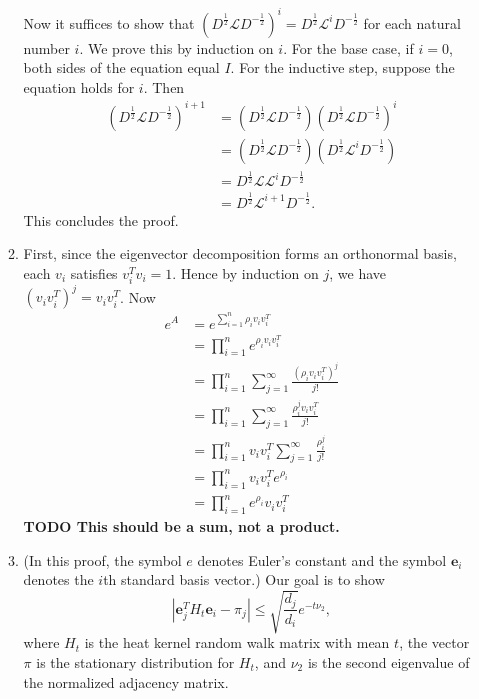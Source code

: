 \documentclass{article}
\newcommand{\todo}[1]{\textbf{TODO #1}}
\newcommand{\1}{\mathbf{1}}
\newcommand{\0}{\mathbf{0}}
\newcommand{\e}{\mathbf{e}}
\renewcommand{\L}{\mathcal{L}}
\begin{document}
\begin{enumerate}
\begin{enumerate}
    Now it suffices to show that $(D^{\frac{1}{2}} \L D^{-\frac{1}{2}})^i = D^{\frac{1}{2}} \L^i D^{-\frac{1}{2}}$ for each natural number $i$.
    We prove this by induction on $i$.
    For the base case, if $i = 0$, both sides of the equation equal $I$.
    For the inductive step, suppose the equation holds for $i$.
    Then
    \begin{align*}
      (D^{\frac{1}{2}} \L D^{-\frac{1}{2}})^{i + 1} & = (D^{\frac{1}{2}} \L D^{-\frac{1}{2}}) (D^{\frac{1}{2}} \L D^{-\frac{1}{2}})^i \\
      & = (D^{\frac{1}{2}} \L D^{-\frac{1}{2}}) (D^{\frac{1}{2}} \L^i D^{-\frac{1}{2}}) \\
      & = D^{\frac{1}{2}} \L \L^i D^{-\frac{1}{2}} \\
      & = D^{\frac{1}{2}} \L^{i + 1} D^{-\frac{1}{2}}.
    \end{align*}
    This concludes the proof.
  \item
    First, since the eigenvector decomposition forms an orthonormal basis, each $v_i$ satisfies $v_i^T v_i = 1$.
    Hence by induction on $j$, we have $(v_i v_i^T)^j = v_i v_i^T$.
    Now
    \begin{align*}
      e^A & = e^{\sum_{i = 1}^n \rho_i v_i v_i^T} \\
      & = \prod_{i = 1}^n e^{\rho_i v_i v_i^T} \\
      & = \prod_{i = 1}^n \sum_{j = 1}^\infty \frac{(\rho_i v_i v_i^T)^j}{j!} \\
      & = \prod_{i = 1}^n \sum_{j = 1}^\infty \frac{\rho_i^j v_i v_i^T}{j!} \\
      & = \prod_{i = 1}^n v_i v_i^T \sum_{j = 1}^\infty \frac{\rho_i^j}{j!} \\
      & = \prod_{i = 1}^n v_i v_i^T e^{\rho_i} \\
      & = \prod_{i = 1}^n e^{\rho_i} v_i v_i^T
    \end{align*}
    \todo{This should be a sum, not a product.}
  \item
    (In this proof, the symbol $e$ denotes Euler's constant and the symbol $\e_i$ denotes the $i$th standard basis vector.)
    Our goal is to show
    \begin{equation*}
      \left|\e_j^T H_t \e_i - \pi_j\right| \leq \sqrt{\frac{d_j}{d_i}} e^{-t \nu_2},
    \end{equation*}
    where $H_t$ is the heat kernel random walk matrix with mean $t$, the vector $\pi$ is the stationary distribution for $H_t$, and $\nu_2$ is the second eigenvalue of the normalized adjacency matrix.


\end{enumerate}
\end{enumerate}
\end{document}
